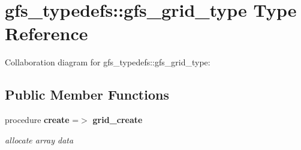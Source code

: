 \section{gfs\+\_\+typedefs\+:\+:gfs\+\_\+grid\+\_\+type Type Reference}
\label{structgfs__typedefs_1_1gfs__grid__type}


Collaboration diagram for gfs\+\_\+typedefs\+:\+:gfs\+\_\+grid\+\_\+type\+:
\subsection*{Public Member Functions}
\begin{DoxyCompactItemize}
\item 
procedure \textbf{ create} =$>$ \textbf{ grid\+\_\+create}
\begin{DoxyCompactList}\small\item\em allocate array data \end{DoxyCompactList}\end{DoxyCompactItemize}
